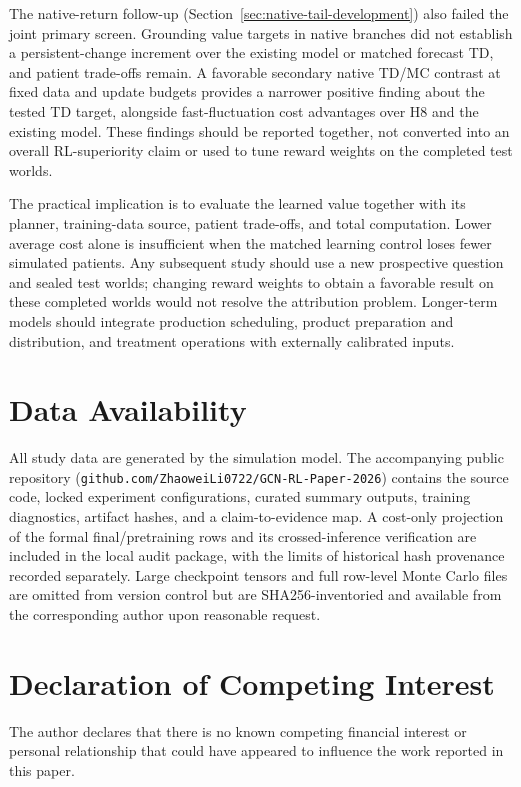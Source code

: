 \documentclass[preprint,review,12pt]{elsarticle}
\begin{document}
The native-return follow-up (Section~\ref{sec:native-tail-development}) also
failed the joint primary screen. Grounding value targets in native branches
did not establish a persistent-change increment over the existing model or
matched forecast TD, and patient trade-offs remain. A favorable secondary
native TD/MC contrast at fixed data and update budgets provides a narrower
positive finding about the tested TD target, alongside fast-fluctuation cost
advantages over H8 and the existing model. These findings should be reported
together, not converted into an overall RL-superiority claim or used to tune
reward weights on the completed test worlds.

The practical implication is to evaluate the learned value together with its
planner, training-data source, patient trade-offs, and total computation. Lower
average cost alone is insufficient when the matched learning control loses
fewer simulated patients. Any subsequent study should use a new prospective
question and sealed test worlds; changing reward weights to obtain a favorable
result on these completed worlds would not resolve the attribution problem.
Longer-term models should integrate production scheduling, product preparation
and distribution, and treatment operations with externally calibrated inputs.

\section*{Data Availability}
All study data are generated by the simulation model. The accompanying
public repository (\texttt{github.com/ZhaoweiLi0722/GCN-RL-Paper-2026}) contains
the source code, locked experiment configurations, curated
summary outputs, training diagnostics, artifact hashes, and a claim-to-evidence
map. A cost-only projection of the formal final/pretraining rows and its
crossed-inference verification are included in the local audit package, with
the limits of historical hash provenance recorded separately. Large checkpoint
tensors and full row-level Monte Carlo files are omitted from
version control but are SHA256-inventoried and available from the corresponding
author upon reasonable request.

\section*{Declaration of Competing Interest}
The author declares that there is no known competing financial interest or personal relationship that could have appeared to influence the work reported in this paper.


\end{document}

